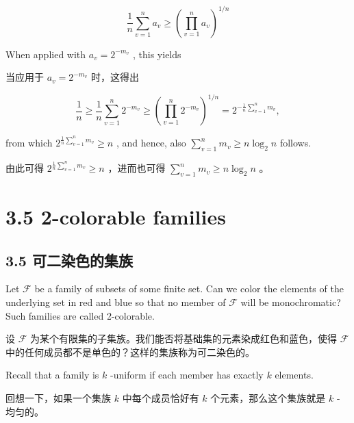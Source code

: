 \documentclass[10pt]{article}
\begin{document}
\[
\frac{1}{n}\mathop{\sum }\limits_{{v = 1}}^{n}{a}_{v} \geq  {\left( \mathop{\prod }\limits_{{v = 1}}^{n}{a}_{v}\right) }^{1/n}
\]

When applied with \({a}_{v} = {2}^{-{m}_{v}}\) , this yields

\begin{tcolorbox}\relax
当应用于 \({a}_{v} = {2}^{-{m}_{v}}\) 时，这得出
\end{tcolorbox}

\[
\frac{1}{n} \geq  \frac{1}{n}\mathop{\sum }\limits_{{v = 1}}^{n}{2}^{-{m}_{v}} \geq  {\left( \mathop{\prod }\limits_{{v = 1}}^{n}{2}^{-{m}_{v}}\right) }^{1/n} = {2}^{-\frac{1}{n}\mathop{\sum }\limits_{{v = 1}}^{n}{m}_{v}},
\]

from which \({2}^{\frac{1}{n}\mathop{\sum }\limits_{{v = 1}}^{n}{m}_{v}} \geq  n\) , and hence, also \(\mathop{\sum }\limits_{{v = 1}}^{n}{m}_{v} \geq  n{\log }_{2}n\) follows.

\begin{tcolorbox}\relax
由此可得 \({2}^{\frac{1}{n}\mathop{\sum }\limits_{{v = 1}}^{n}{m}_{v}} \geq  n\) ，进而也可得 \(\mathop{\sum }\limits_{{v = 1}}^{n}{m}_{v} \geq  n{\log }_{2}n\) 。
\end{tcolorbox}

\section*{3.5 2-colorable families}

\begin{tcolorbox}\relax
\section*{3.5 可二染色的集族}
\end{tcolorbox}

Let \(\mathcal{F}\) be a family of subsets of some finite set. Can we color the elements of the underlying set in red and blue so that no member of \(\mathcal{F}\) will be monochromatic? Such families are called 2-colorable.

\begin{tcolorbox}\relax
设 \(\mathcal{F}\) 为某个有限集的子集族。我们能否将基础集的元素染成红色和蓝色，使得 \(\mathcal{F}\) 中的任何成员都不是单色的？这样的集族称为可二染色的。
\end{tcolorbox}

Recall that a family is \(k\) -uniform if each member has exactly \(k\) elements.

\begin{tcolorbox}\relax
回想一下，如果一个集族 \(k\) 中每个成员恰好有 \(k\) 个元素，那么这个集族就是 \(k\) - 均匀的。
\end{tcolorbox}
\end{document}
